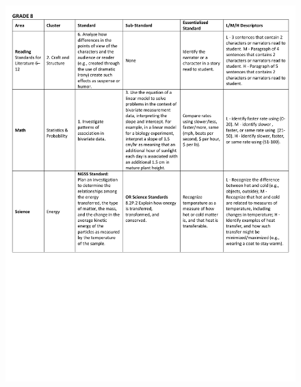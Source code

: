 \documentclass[]{article}
\begin{document}
\begin{figure}
\centering
\includegraphics{Figures/Standards/Grade8.pdf}
\caption{}
\end{figure}
\end{document}
